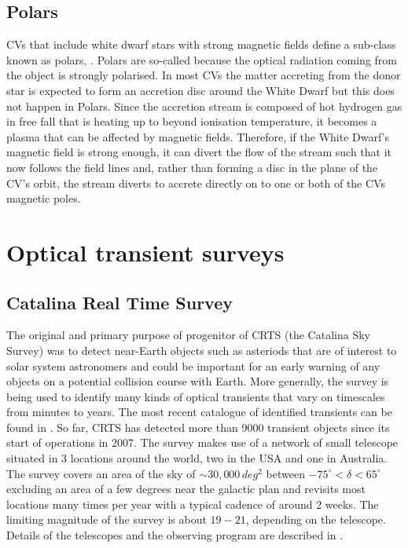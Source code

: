 \documentclass[a4paper,fleqn,usenatbib]{mnras}
\begin{document}
\subsection{Polars}
CVs that include white dwarf stars with strong magnetic fields define a sub-class known as polars, \citep{CropperReview}. Polars are so-called because the optical radiation coming from the object is strongly polarised. In most CVs the matter accreting from the donor star is expected to form an accretion disc around the White Dwarf but this does not happen in Polars. Since the accretion stream is composed of hot hydrogen gas in free fall that is heating up to beyond ionisation temperature, it becomes a plasma that can be affected by magnetic fields. Therefore, if the White Dwarf's magnetic field is strong enough, it can divert the flow of the stream such that it now follows the field lines and, rather than forming a disc in the plane of the CV's orbit, the stream diverts to accrete directly on to one or both of the CVs magnetic poles. 

\section{Optical transient surveys}

\subsection{Catalina Real Time Survey}
The original and primary purpose of progenitor of CRTS (the Catalina Sky Survey) was to detect near-Earth objects such as asteriods that are of interest to solar system astronomers and could be important for an early warning of any objects on a potential collision course with Earth. More generally, the survey is being used to identify many kinds of optical transients that vary on timescales from minutes to years. The most recent catalogue of identified transients can be found in \citet{CatalinaCatalog}. So far, CRTS has detected more than 9000 transient objects since its start of operations in 2007. The survey makes use of a network of  small telescope situated in 3 locations around the world, two in the USA and one in Australia. The survey covers an area of the sky of $\sim 30,000\,deg^2$ between $-75^\circ < \delta < 65^\circ$ excluding an area of a few degrees near the galactic plan and revisits most locations many times per year with a typical cadence of around 2 weeks. The limiting magnitude of the survey is about $19-21$, depending on the telescope. Details of the telescopes and the observing program are described in \citet{Drake2009}. 
\end{document}
